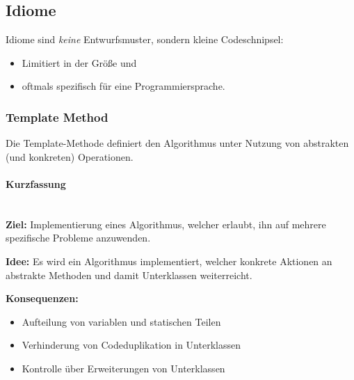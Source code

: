 \documentclass[ngerman,color=3b]{tuda_summary}
\begin{document}
\subsection{Idiome}
Idiome sind \textit{keine} Entwurfsmuster, sondern kleine Codeschnipsel:
\begin{itemize}
    \item Limitiert in der Größe und
    \item oftmals spezifisch für eine Programmiersprache.
\end{itemize}

\subsubsection{Template Method}
\begin{definition}
    Die Template-Methode definiert den Algorithmus unter Nutzung von abstrakten (und konkreten) Operationen.
\end{definition}
\paragraph{Kurzfassung}\mbox{}\\
\textbf{Ziel:} Implementierung eines Algorithmus, welcher erlaubt, ihn auf mehrere spezifische Probleme anzuwenden.

\textbf{Idee:} Es wird ein Algorithmus implementiert, welcher konkrete Aktionen an abstrakte Methoden und damit Unterklassen weiterreicht.

\textbf{Konsequenzen:}
\begin{itemize}
    \item Aufteilung von variablen und statischen Teilen
    \item Verhinderung von Codeduplikation in Unterklassen
    \item Kontrolle über Erweiterungen von Unterklassen
\end{itemize}
\end{document}
